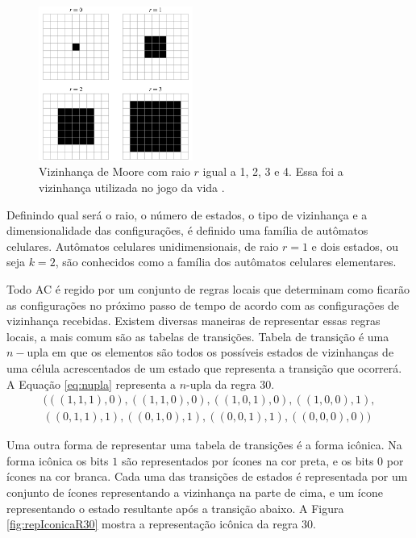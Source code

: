 \documentclass[12pt,a4paper]{article}
\begin{document}
	\begin{figure}[h!]
	  \centering
	  \includegraphics[width=0.45\textwidth]{fig_vMoore.png}
	  \caption{Vizinhança de Moore com raio $r$ igual a 1, 2, 3 e 4. Essa foi a vizinhança utilizada no jogo da vida \cite{weisstein2015c}.}
	  \label{fig:vMoore}
	\end{figure}

Definindo qual será o raio, o número de estados, o tipo de vizinhança e a dimensionalidade das configurações, é definido uma família de autômatos celulares. Autômatos celulares unidimensionais, de raio $r=1$ e dois estados, ou seja $k=2$, são conhecidos como a família dos autômatos celulares elementares.

Todo AC é regido por um conjunto de regras locais que determinam como ficarão as configurações no próximo passo de tempo de acordo com as configurações de vizinhança recebidas. Existem diversas maneiras de representar essas regras locais, a mais comum são as tabelas de transições. Tabela de transição é uma $n-$upla em que os elementos são todos os possíveis estados de vizinhanças de uma célula acrescentados de um estado que representa a transição que ocorrerá. A Equação \ref{eq:nupla} representa a $n$-upla da regra 30.
\begin{equation}
\begin{split}
(((1,1,1),0),((1,1,0),0),((1,0,1),0),((1,0,0),1),\\
((0,1,1),1),((0,1,0),1),((0,0,1),1),((0,0,0),0))
\label{eq:nupla}
\end{split}
\end{equation}

Uma outra forma de representar uma tabela de transições é a forma icônica. Na forma icônica os bits $1$ são representados por ícones na cor preta, e os bits $0$ por ícones na cor branca. Cada uma das transições de estados é representada por um conjunto de ícones representando a vizinhança na parte de cima, e um ícone representando o estado resultante após a transição abaixo. A Figura \ref{fig:repIconicaR30} mostra a representação icônica da regra 30.
\end{document}
